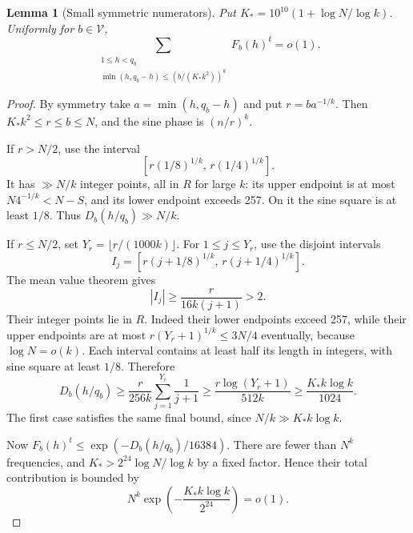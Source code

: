 \documentclass[11pt]{amsart}
\numberwithin{equation}{section}
\newtheorem{lemma}[theorem]{Lemma}
\theoremstyle{remark}
\begin{document}
\begin{lemma}[Small symmetric numerators]\label{lem:smallnumerators}
Put \(K_* =10^{10}(1+\log N/\log k)\). Uniformly for \(b\in\mathcal V\),
\[
 \sum_{\substack{1\le h<q_b\\
 \min(h,q_b-h)\le (b/(K_*k^2))^k}}F_b(h)^t=o(1).
\]
\end{lemma}
\begin{proof}
By symmetry take \(a=\min(h,q_b-h)\) and put \(r=ba^{-1/k}\).
Then \(K_*k^2\le r\le b\le N\), and the sine phase is \((n/r)^k\).

If \(r>N/2\), use the interval
\[
 [r(1/8)^{1/k},\,r(1/4)^{1/k}].
\]
It has \(\gg N/k\) integer points, all in \(R\) for large \(k\):
its upper endpoint is at most \(N4^{-1/k}<N-S\), and its lower
endpoint exceeds 257. On it the sine square is at least \(1/8\).
Thus \(D_b(h/q_b)\gg N/k\).

If \(r\le N/2\), set \(Y_r=\lfloor r/(1000k)\rfloor\).
For \(1\le j\le Y_r\), use the disjoint intervals
\[
 I_j=[r(j+1/8)^{1/k},\,r(j+1/4)^{1/k}].
\]
The mean value theorem gives
\[
 |I_j|\ge \frac r{16k(j+1)}>2.
\]
Their integer points lie in \(R\).
Indeed their lower endpoints exceed 257, while their upper endpoints
are at most \(r(Y_r+1)^{1/k}\le3N/4\) eventually, because
\(\log N=o(k)\). Each interval contains at least half its length in
integers, with sine square at least \(1/8\). Therefore
\[
 D_b(h/q_b)
 \ge\frac r{256k}\sum_{j=1}^{Y_r}\frac1{j+1}
 \ge\frac{r\log(Y_r+1)}{512k}
 \ge\frac{K_*k\log k}{1024}.
\]
The first case satisfies the same final bound, since
\(N/k\gg K_*k\log k\).

Now \(F_b(h)^t\le\exp(-D_b(h/q_b)/16384)\).
There are fewer than \(N^k\) frequencies, and
\(K_*>2^{24}\log N/\log k\) by a fixed factor. Hence their total
contribution is bounded by
\[
 N^k\exp\!\left(-\frac{K_*k\log k}{2^{24}}\right)=o(1).
\]
\end{proof}
\end{document}
